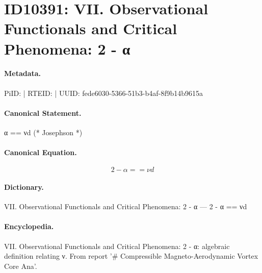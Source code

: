 \section*{ID10391: VII. Observational Functionals and Critical Phenomena: 2 - α}
\paragraph{Metadata.}
PiID:  | RTEID:  | UUID: fede6030-5366-51b3-b4af-8f9b14b9615a

\paragraph{Canonical Statement.}
α == νd (* Josephson *)

\paragraph{Canonical Equation.}
\[
2 - α == νd
\]

\paragraph{Dictionary.}
VII. Observational Functionals and Critical Phenomena: 2 - α — 2 - α == νd

\paragraph{Encyclopedia.}
VII. Observational Functionals and Critical Phenomena: 2 - α: algebraic definition relating ν. From report '\# Compressible Magneto-Aerodynamic Vortex Core Ana'.
